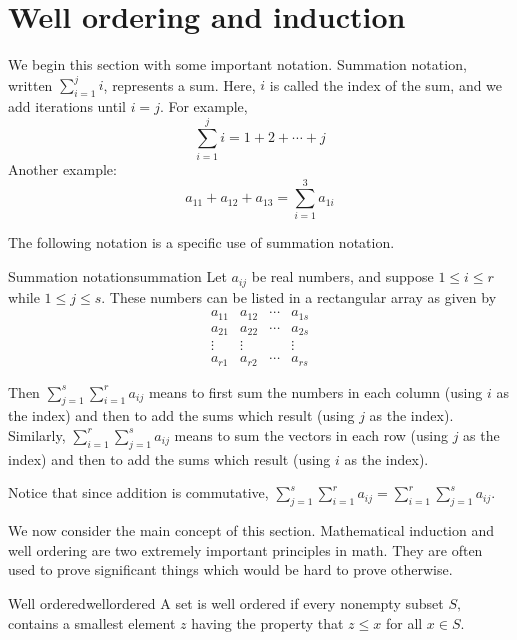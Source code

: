 \section{Well ordering and induction}

\label{wellorderingsection}

We begin this section with some important notation. Summation notation, written $\sum_{i=1}^{j} i $, represents a sum. Here, $i$ is called the index of the sum, and we add iterations until $i=j$. For example, 
\[
\sum_{i=1}^{j} i = 1 + 2 + \cdots + j 
\]
Another example: 
\[
a_{11} + a_{12} + a_{13}  = \sum_{i=1}^{3} a_{1i}
\]

The following notation is a specific use of summation notation. 

\begin{notation}{Summation notation}{summation}
Let $a_{ij}$ be real numbers, and suppose  $1\leq i\leq r$ while $
1\leq j\leq s$. These numbers can be listed in a rectangular array as given by 
\begin{equation*}
\begin{array}{cccc}
a_{11} & a_{12} & \cdots & a_{1s} \\ 
a_{21} & a_{22} & \cdots & a_{2s} \\ 
\vdots & \vdots &  & \vdots \\ 
a_{r1} & a_{r2} & \cdots & a_{rs}
\end{array}
\end{equation*}

Then $\sum_{j=1}^{s}\sum_{i=1}^{r} a_{ij}$ means to first sum the numbers
in each column (using $i$ as the index) and then to add the sums which result (using $j$ as the index). Similarly,  
$\sum_{i=1}^{r}\sum_{j=1}^{s} a_{ij}$ means to sum the vectors in
each row (using $j$ as the index) and then to add the sums which result (using $i$ as the index). 
\end{notation}

Notice that since addition is commutative, $\sum_{j=1}^{s}\sum_{i=1}^{r} a_{ij} = \sum_{i=1}^{r}\sum_{j=1}^{s} a_{ij}$. 

We now consider the main concept of this section. Mathematical induction and well ordering are two extremely important
principles in math. They are often used to prove significant things which
would be hard to prove otherwise.

\begin{definition}{Well ordered}{wellordered}
 A set is well ordered if every nonempty subset $S,$ contains a
smallest element $z$ having the property that $z\leq x$ for all $x\in S.$
\end{definition}

